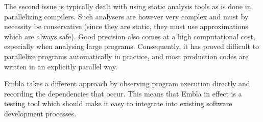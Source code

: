 The second issue is typically
dealt with using static analysis tools as is done in parallelizing
compilers. Such analysers are however very complex and must by
necessity be conservative (since they are static, they must use
approximations which are always safe). Good precision also comes at a
high computational cost, especially when analysing large programs.
Consequently, it has proved difficult to parallelize programs 
automatically in 
practice, and most production codes are written in an explicitly 
parallel way.

Embla takes a different approach by observing program execution
directly and recording the dependencies that occur. This means that
Embla in effect is a testing tool which should make it easy to 
integrate into existing software development processes.



